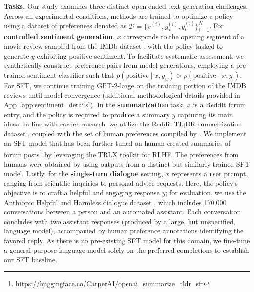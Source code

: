 \textbf{Tasks.} Our study examines three distinct open-ended text generation challenges. Across all experimental conditions, methods are trained to optimize a policy using a dataset of preferences denoted as $\mathcal{D}=\bigl\{x^{(i)}, y_w^{(i)}, y_l^{(i)}\bigr\}_{i=1}^N$. For \textbf{controlled sentiment generation}, $x$ corresponds to the opening segment of a movie review sampled from the IMDb dataset \cite{maas-EtAl:2011:ACL-HLT2011}, with the policy tasked to generate $y$ exhibiting positive sentiment. To facilitate systematic assessment, we synthetically construct preference pairs from model generations, employing a pre-trained sentiment classifier such that $p(\text{positive}\mid x,y_w)>p(\text{positive}\mid x,y_l)$. For SFT, we continue training GPT-2-large on the training portion of the IMDB reviews until model convergence (additional methodological details provided in App~\ref{app:sentiment_details}). In the \textbf{summarization} task, $x$ is a Reddit forum entry, and the policy is required to produce a summary $y$ capturing its main ideas. In line with earlier research, we utilize the Reddit TL;DR summarization dataset \citep{volske-etal-2017-tl}, coupled with the set of human preferences compiled by \citeauthor{stiennon2022learning}. We implement an SFT model that has been further tuned on human-created summaries of forum posts\footnote{\url{https://huggingface.co/CarperAI/openai_summarize_tldr_sft}} by leveraging the TRLX \citep{leandro_von_werra_2023_7790115} toolkit for RLHF. The preferences from humans were obtained by \citeauthor{stiennon2022learning} using outputs from a distinct but similarly-trained SFT model. Lastly, for the \textbf{single-turn dialogue} setting, $x$ represents a user prompt, ranging from scientific inquiries to personal advice requests. Here, the policy’s objective is to craft a helpful and engaging response $y$; for evaluation, we use the Anthropic Helpful and Harmless dialogue dataset \citep{bai2022training}, which includes 170,000 conversations between a person and an automated assistant. Each conversation concludes with two assistant responses (produced by a large, but unspecified, language model), accompanied by human preference annotations identifying the favored reply. As there is no pre-existing SFT model for this domain, we fine-tune a general-purpose language model solely on the preferred completions to establish our SFT baseline.

